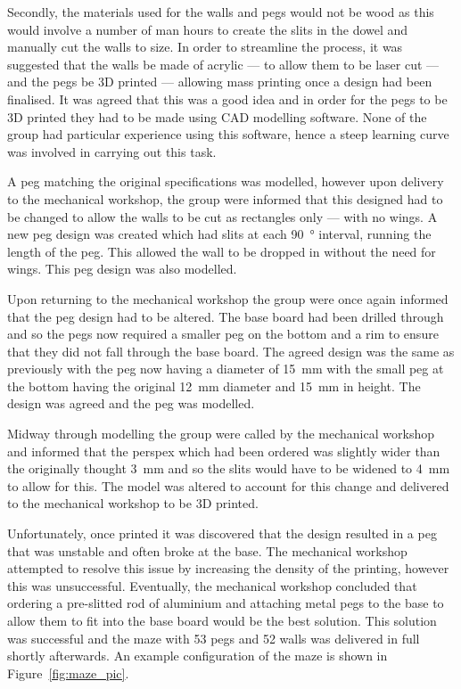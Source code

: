 Secondly, the materials used for the walls and pegs would not be wood as this
would involve a number of man hours to create the slits in the dowel and
manually cut the walls to size. In order to streamline the process, it was
suggested that the walls be made of acrylic --- to allow
them to be laser cut --- and the pegs be 3D printed --- allowing mass printing
once a design had been finalised. It was agreed that this was a good idea and
in order for the pegs to be 3D printed they had to be made using CAD modelling
software. None of the group had particular experience using this software, hence
a steep learning curve was involved in carrying out this task.

A peg matching the original specifications was modelled, however upon delivery
to the mechanical workshop, the group were informed that this designed had to be 
changed to allow the walls to be cut as rectangles only --- with no wings. A new
peg design was created which had slits at each \SI{90}{\degree} interval,
running the length of the peg. This allowed the wall to be dropped in without
the need for wings. This peg design was also modelled.

Upon returning to the mechanical workshop the group were once again informed
that the peg design had to be altered. The base board had been drilled through
and so the pegs now required a smaller peg on the bottom and a rim to ensure
that they did not fall through the base board. The agreed design was the same as
previously with the peg now having a diameter of \SI{15}{\mm} with the small peg
at the bottom having the original \SI{12}{\mm} diameter and \SI{15}{\mm} in
height. The design was agreed and the peg was modelled.

Midway through modelling the group were called by the mechanical workshop and
informed that the perspex which had been ordered was slightly wider than the
originally thought \SI{3}{\mm} and so the slits would have to be widened to
\SI{4}{\mm} to allow for this. The model was altered to account for this change and delivered to the mechanical workshop to be 3D printed.

Unfortunately, once printed it was discovered that the design resulted in a peg
that was unstable and often broke at the base. The mechanical workshop
attempted to resolve this issue by increasing the density of the printing,
however this was unsuccessful. Eventually, the mechanical workshop concluded
that ordering a pre-slitted rod of aluminium and attaching metal pegs to the
base to allow them to fit into the base board would be the best solution. This
solution was successful and the maze with 53 pegs and 52 walls was
delivered in full shortly afterwards. An example configuration of the maze is shown in Figure~\ref{fig:maze_pic}.

